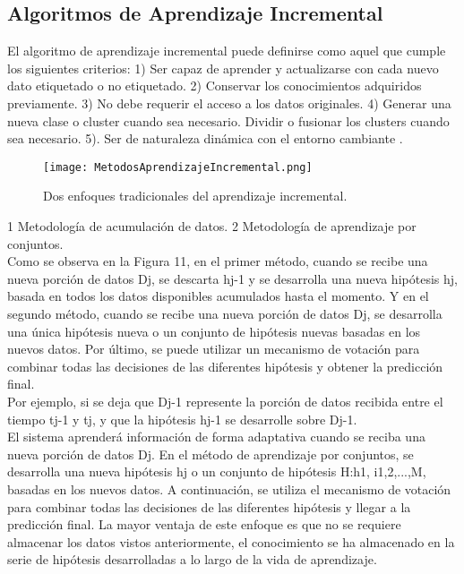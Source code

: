     \subsection{Algoritmos de Aprendizaje Incremental}
      El algoritmo de aprendizaje incremental puede definirse como aquel que cumple los siguientes criterios:  
      1) Ser capaz de aprender y actualizarse con cada nuevo dato etiquetado o no etiquetado. 
      2) Conservar los conocimientos adquiridos previamente.
      3) No debe requerir el acceso a los datos originales. 
      4) Generar una nueva clase o cluster cuando sea necesario. Dividir o fusionar los clusters cuando sea necesario. 
      5). Ser de naturaleza dinámica con el entorno cambiante \cite{Deshmukh2013}.

        \begin{figure}[H]
          \centering
          \texttt{[image: MetodosAprendizajeIncremental.png]}
          \caption{Dos enfoques tradicionales del aprendizaje incremental.}
          \label{fig:fig11}
        \end{figure} 
      
      1 Metodología de acumulación de datos. 2 Metodología de aprendizaje por conjuntos.\\
        
		Como se observa en la Figura 11, en el primer método, cuando se recibe una nueva porción de datos Dj, se descarta hj-1 y se desarrolla una nueva hipótesis hj, basada en todos los datos disponibles acumulados hasta el momento. 
		Y en el segundo método, cuando se recibe una nueva porción de datos Dj, se desarrolla una única hipótesis nueva o un conjunto de hipótesis nuevas basadas en los nuevos datos. 
		Por último, se puede utilizar un mecanismo de votación para combinar todas las decisiones de las diferentes hipótesis y obtener la predicción final.\\
		
		Por ejemplo, si se deja que Dj-1 represente la porción de datos recibida entre el tiempo tj-1 y tj, y que la hipótesis hj-1 se desarrolle sobre Dj-1.\\
		El sistema aprenderá información de forma adaptativa cuando se reciba una nueva porción de datos Dj.	
		En el método de aprendizaje por conjuntos, se desarrolla una nueva hipótesis hj o un conjunto de hipótesis H:h1, i1,2,...,M, basadas en los nuevos datos.  
		A continuación, se utiliza el mecanismo de votación para combinar todas las decisiones de las diferentes hipótesis y llegar a la predicción final.
		La mayor ventaja de este enfoque es que no se requiere almacenar los datos vistos anteriormente, el conocimiento se ha almacenado en la serie de hipótesis desarrolladas a lo largo de la vida de aprendizaje.\\
		
